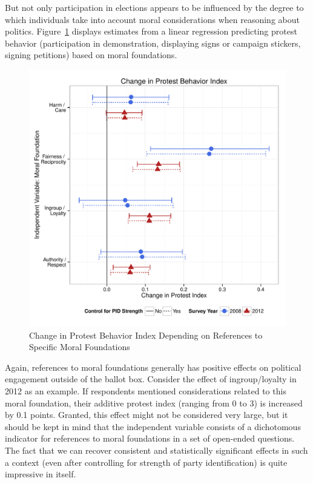 \documentclass[12pt]{article}
\begin{document}
But not only participation in elections appears to be influenced by the degree to which individuals take into account moral considerations when reasoning about politics. Figure~\ref{fig:m2b_vote} displays estimates from a linear regression predicting protest behavior (participation in demonstration, displaying signs or campaign stickers, signing petitions) based on moral foundations.

\begin{figure}[ht]\centering
\includegraphics[scale=.5]{../calc/fig/m2e_part.pdf}
\caption{Change in Protest Behavior Index Depending on References to Specific Moral Foundations}\label{fig:m2b_vote}
\end{figure}

Again, references to moral foundations generally has positive effects on political engagement outside of the ballot box. Consider the effect of ingroup/loyalty in 2012 as an example. If respondents mentioned considerations related to this moral foundation, their additive protest index (ranging from 0 to 3) is increased by 0.1 points. Granted, this effect might not be considered very large, but it should be kept in mind that the independent variable consists of a dichotomous indicator for references to moral foundations in a set of open-ended questions. The fact that we can recover consistent and statistically significant effects in such a context (even after controlling for strength of party identification) is quite impressive in itself.
\end{document}
